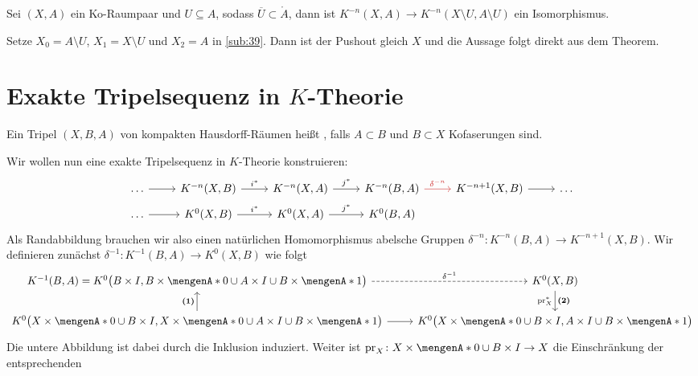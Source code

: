 

\begin{korollar}[label=sub:310, {name=[Ausschneidung für $K$-Theorie]}]
Sei $(X,A)$ ein Ko-Raumpaar und $U \subseteq A$, sodass $\overline{U} \subset \mathring{A}$, dann ist $K^{-n}(X,A) \to K^{-n}(X \setminus U, A \setminus U)$ ein 
Isomorphismus.	
\end{korollar}
\begin{beweis}
Setze $X_0 = A \setminus U$, $X_1 = X \setminus U$ und $X_2=A$ in \autoref{sub:39}. Dann ist der Pushout gleich $X$ und die Aussage folgt direkt aus dem Theorem. 
\end{beweis}
\newpage
\section*{Exakte Tripelsequenz in $K$-Theorie}
\begin{definition}[{name=[Ko-Raumtripel]}]
Ein Tripel $(X,B,A)$ von kompakten Hausdorff-Räumen heißt , falls $A \subset B$ und $B \subset X$ Kofaserungen sind. 
\end{definition}
Wir wollen nun eine exakte Tripelsequenz in $K$-Theorie konstruieren:
\[
	\begin{tikzcd}[row sep=0.5em]
		\ldots \rar & K^{-n}(X,B) \rar["i^*"] & K^{-n}(X,A) \rar["j^*"] & K^{-n}(B,A) \rar["\delta^{-n}",Firebrick3] & K^{-n+1}(X,B) \rar & \ldots \\
		\ldots \rar & K^0(X,B) \rar["i^*"] & K^0(X,A) \rar["j^*"] & K^0(B,A)
	\end{tikzcd}
\]
Als Randabbildung brauchen wir also einen natürlichen Homomorphismus abelsche Gruppen $\delta^{-n} \colon K^{-n}(B,A) \to K^{-n+1}(X,B)$. Wir definieren zunächst
$\delta^{-1} \colon K^{-1}(B,A) \to K^0(X,B)$ wie folgt
\[
	\begin{tikzcd}
		K^{-1}(B,A) = K^0 \enbrace[\big]{B \times I, B \times \set{0} \cup A \times I \cup B \times \set{1}} \rar["\delta^{-1}",dashed] & K^0(X,B) 
		\dar["\textbf{(2)}","\pr^*_X"'] \\
		K^0 \enbrace[\big]{X \times \set{0} \cup B \times I, X \times \set{0} \cup A \times I \cup B \times \set{1}} \uar["\textbf{(1)}"] \rar  &
		K^0 \enbrace[\big]{X \times \set{0} \cup B  \times I, A \times I \cup B \times \set{1}}   
	\end{tikzcd}
\]
Die untere Abbildung ist dabei durch die Inklusion induziert. Weiter ist $\pr_X \colon X \times \set{0} \cup B \times I \to X$ die Einschränkung der entsprechenden 
